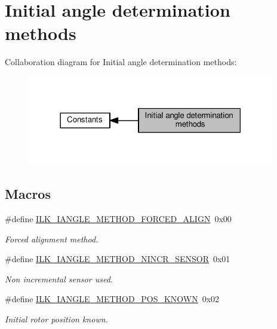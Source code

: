 \hypertarget{group__IL__CONST__IANGLE__METHOD}{}\section{Initial angle determination methods}
\label{group__IL__CONST__IANGLE__METHOD}
Collaboration diagram for Initial angle determination methods\+:\nopagebreak
\begin{figure}[H]
\begin{center}
\leavevmode
\includegraphics[width=306pt]{group__IL__CONST__IANGLE__METHOD}
\end{center}
\end{figure}
\subsection*{Macros}
\begin{DoxyCompactItemize}
\item 
\#define \hyperlink{group__IL__CONST__IANGLE__METHOD_ga7161a9b8940249da7355c5a799735872}{I\+L\+K\+\_\+\+I\+A\+N\+G\+L\+E\+\_\+\+M\+E\+T\+H\+O\+D\+\_\+\+F\+O\+R\+C\+E\+D\+\_\+\+A\+L\+I\+GN}~0x00
\begin{DoxyCompactList}\small\item\em Forced alignment method. \end{DoxyCompactList}\item 
\#define \hyperlink{group__IL__CONST__IANGLE__METHOD_ga6b4be92e288bbf584fe0836291b222c6}{I\+L\+K\+\_\+\+I\+A\+N\+G\+L\+E\+\_\+\+M\+E\+T\+H\+O\+D\+\_\+\+N\+I\+N\+C\+R\+\_\+\+S\+E\+N\+S\+OR}~0x01
\begin{DoxyCompactList}\small\item\em Non incremental sensor used. \end{DoxyCompactList}\item 
\#define \hyperlink{group__IL__CONST__IANGLE__METHOD_gae83411aac214acbb2259a47cdb67f3bc}{I\+L\+K\+\_\+\+I\+A\+N\+G\+L\+E\+\_\+\+M\+E\+T\+H\+O\+D\+\_\+\+P\+O\+S\+\_\+\+K\+N\+O\+WN}~0x02
\begin{DoxyCompactList}\small\item\em Initial rotor position known. \end{DoxyCompactList}\end{DoxyCompactItemize}


